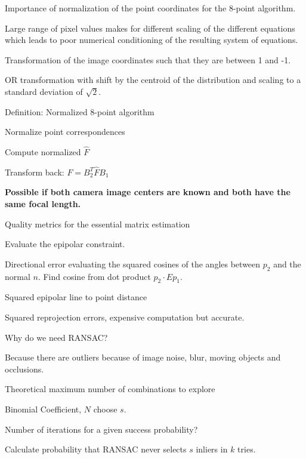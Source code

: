 \documentclass[10pt,a4paper]{scrartcl}
\begin{document}
\begin{multicols*}{2}
\begin{QandA}
{Importance of normalization of the point coordinates for the 8-point algorithm.}
\item Large range of pixel values makes for different scaling of the different equations which leads to poor numerical conditioning of the resulting system of equations.
\item Transformation of the image coordinates such that they are between 1 and -1.
\item OR transformation with shift by the centroid of the distribution and scaling to a standard deviation of $\sqrt{2}$.
\end{QandA}

\begin{QandA}
{Definition: Normalized 8-point algorithm}
\item Normalize point correspondences
\item Compute normalized $\hat{F}$ 
\item Transform back: $F = B_2^T\hat{F} B_1$
\item \textbf{Possible if both camera image centers are known and both have the same focal length.}
\end{QandA}

\begin{QandA}
{Quality metrics for the essential matrix estimation}
\item Evaluate the epipolar constraint.
\item Directional error evaluating the squared cosines of the angles between $p_2$ and the normal $n$. Find cosine from dot product $p_2\cdot Ep_1$.
\item Squared epipolar line to point distance
\item Squared reprojection errors, expensive computation but accurate.
\end{QandA}

\begin{QandA}
{Why do we need RANSAC?}
\item Because there are outliers because of image noise, blur, moving objects and occlusions.
\end{QandA}

\begin{QandA}
{Theoretical maximum number of combinations to explore}
\item Binomial Coefficient, $N$ choose $s$.
\end{QandA}

\begin{QandA}
{Number of iterations for a given success probability?}
\item {}
\item Calculate probability that RANSAC never selects $s$ inliers in $k$ tries.
\end{QandA}


\end{multicols*}
\end{document}
